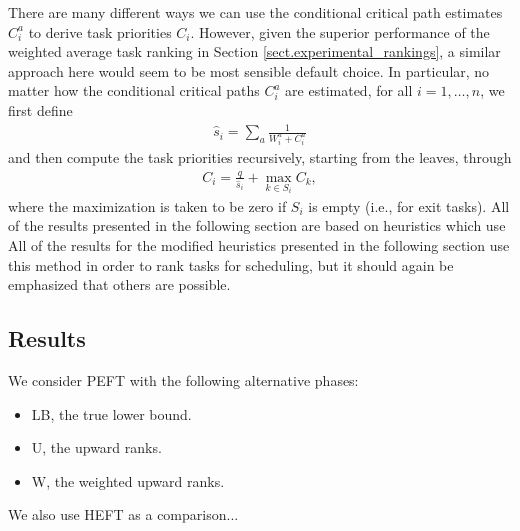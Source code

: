 \documentclass[12pt]{article}
\begin{document}
There are many different ways we can use the conditional critical path estimates $C_i^a$ to derive task priorities $C_i$. However, given the superior performance of the weighted average task ranking in Section \ref{sect.experimental_rankings}, a similar approach here would seem to be most sensible default choice. In particular, no matter how the conditional critical paths $C_i^a$ are estimated, for all $i = 1, \dots, n$, we first define   
\begin{align*}
\hat{s}_i = \sum_{a} \frac{1}{W_i^a + C_i^a} 
\end{align*}    
and then compute the task priorities recursively, starting from the leaves, through 
\begin{align}
C_i = \frac{q}{\hat{s}_i} + \max_{k \in S_i} C_k, \label{eq.alt_prios}
\end{align}  
where the maximization is taken to be zero if $S_i$ is empty (i.e., for exit tasks). All of the results presented in the following section are based on heuristics which use  
All of the results for the modified heuristics presented in the following section use this method in order to rank tasks for scheduling, but it should again be emphasized that others are possible. 


\subsection{Results}
\label{subsect.processor_selection_results}

We consider PEFT with the following alternative phases:
\begin{itemize}
	\item LB, the true lower bound.
	\item U, the upward ranks.
	\item W, the weighted upward ranks.
\end{itemize}
We also use HEFT as a comparison...




\end{document}
